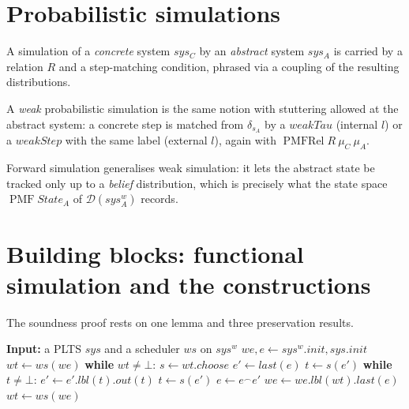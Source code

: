 









\section{Probabilistic simulations}

A simulation of a \emph{concrete} system $sys_C$ by an \emph{abstract} system $sys_A$ is carried by a relation $R$ and a step-matching condition, phrased via a coupling of the resulting distributions.





A \emph{weak} probabilistic simulation is the same notion with stuttering allowed at the abstract system: a concrete step is matched from $\delta_{s_A}$ by a $weakTau$ (internal $l$) or a $weakStep$ with the same label (external $l$), again with $\operatorname{PMFRel} R\ \mu_C\ \mu_A$.



Forward simulation generalises weak simulation: it lets the abstract state be tracked only up to a \emph{belief} distribution, which is precisely what the state space $\operatorname{PMF} State_A$ of $\mathcal{D}(sys_A^w)$ records.

\section{Building blocks: functional simulation and the constructions}

The soundness proof rests on one lemma and three preservation results.







\begin{algorithm}
    \caption{Simulating a scheduler on $sys^w$}
    \label{alg:expand}
    \begin{algorithmic}
        \State \textbf{Input:} a PLTS $sys$ and a scheduler $ws$ on $sys^w$
        \medskip
        \State $we, e \gets sys^w.init, sys.init$
        \State $wt \gets ws(we)$
        \State \textbf{while} $wt \ne \bot$:
        \State\quad $s \gets wt.choose$ 
        \State\quad $e' \gets last(e)$
        \State\quad $t \gets s(e')$
        \State\quad \textbf{while} $t \ne \bot$:
        \State\quad\quad $e' \gets e'.lbl(t).out(t)$
        \State\quad\quad $t \gets s(e')$
        \State\quad $e \gets e^\frown e'$
        \State\quad $we \gets we.lbl(wt).last(e)$
        \State\quad $wt \gets ws(we)$
    \end{algorithmic}
\end{algorithm}

